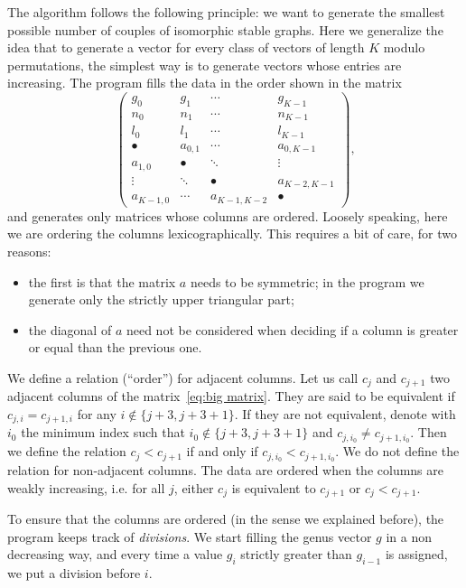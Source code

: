 \documentclass{amsart}
\theoremstyle{plain}
\theoremstyle{definition}
\begin{document}
The algorithm follows the following principle: we want to generate
the smallest possible number of couples of isomorphic stable graphs.
Here we generalize the idea that to generate a vector for every 
class of vectors of length $K$ modulo permutations, the 
simplest way is to generate vectors whose entries are increasing. 
The program fills the data in the order shown in the matrix
\begin{equation}\label{eq:big matrix}
  \begin{pmatrix}
    g_0 & g_1 & \cdots & g_{K-1}\\
    n_0 & n_1 & \cdots & n_{K-1}\\
    l_0 & l_1 & \cdots & l_{K-1}\\
    \hline
    \bullet & a_{0,1} & \cdots & a_{0,K-1}\\
    a_{1,0} & \bullet & \ddots & \vdots\\
    \vdots & \ddots & \bullet & a_{K-2,K-1}\\
    a_{K-1,0} & \cdots & a_{K-1,K-2} & \bullet
  \end{pmatrix}\text{,}
\end{equation}
and generates only matrices whose columns are ordered. Loosely speaking,
here we are ordering the columns lexicographically. This requires a
bit of care, for two reasons:
\begin{itemize}
\item the first is that the matrix $a$ needs to be symmetric; in the
  program we generate only the strictly upper triangular part;
\item the diagonal of $a$ need not be considered when deciding if a
  column is greater or equal than the previous one.
\end{itemize}

We define a relation (``order'') for adjacent columns. 
Let us call $c_j$ and $c_{j+1}$ two adjacent columns
of the matrix~\ref{eq:big matrix}. They are said to be equivalent if
$c_{j,i} = c_{j+1,i}$ for any $i \notin \{j+3, j+3+1\}$. If they are not
equivalent, denote with $i_0$ the minimum index such that $i_0 \notin \{
j+3, j+3+1\}$ and $c_{j,i_0} \neq c_{j+1,i_0}$. Then we define the  
relation $c_j < c_{j+1}$ if and only if $c_{j,i_0} < c_{j+1,i_0}$. 
We do not define the relation for non-adjacent columns.
The data are ordered when the columns are weakly increasing, i.e.
for all $j$, either $c_j$ is equivalent to $c_{j+1}$ or $c_j < c_{j+1}$.


To ensure that the columns are ordered (in the sense we explained
before), the program keeps track of \emph{divisions}. We start filling
the genus vector $g$ in a non decreasing way, and every time 
a value $g_i$ strictly greater than $g_{i-1}$ is assigned, we put a 
division before $i$. %
\end{document}
